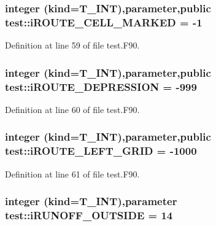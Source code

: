 \hypertarget{namespacetest_a0b4633c7ece605f3f9e541d1bb6068b1}{
\subsubsection[{iROUTE\_\-CELL\_\-MARKED}]{\setlength{\rightskip}{0pt plus 5cm}integer (kind={\bf T\_\-INT}),parameter,public {\bf test::iROUTE\_\-CELL\_\-MARKED} = -\/1}}
\label{namespacetest_a0b4633c7ece605f3f9e541d1bb6068b1}


Definition at line 59 of file test.F90.

\hypertarget{namespacetest_a238a0131e776ca1d31fb18253d86fdbe}{
\subsubsection[{iROUTE\_\-DEPRESSION}]{\setlength{\rightskip}{0pt plus 5cm}integer (kind={\bf T\_\-INT}),parameter,public {\bf test::iROUTE\_\-DEPRESSION} = -\/999}}
\label{namespacetest_a238a0131e776ca1d31fb18253d86fdbe}


Definition at line 60 of file test.F90.

\hypertarget{namespacetest_a828d11529416772ecac92d8ca31c2056}{
\subsubsection[{iROUTE\_\-LEFT\_\-GRID}]{\setlength{\rightskip}{0pt plus 5cm}integer (kind={\bf T\_\-INT}),parameter,public {\bf test::iROUTE\_\-LEFT\_\-GRID} = -\/1000}}
\label{namespacetest_a828d11529416772ecac92d8ca31c2056}


Definition at line 61 of file test.F90.

\hypertarget{namespacetest_a4e979c97a931d097b815a1e8b62663f9}{
\subsubsection[{iRUNOFF\_\-OUTSIDE}]{\setlength{\rightskip}{0pt plus 5cm}integer (kind={\bf T\_\-INT}),parameter {\bf test::iRUNOFF\_\-OUTSIDE} = 14}}
\label{namespacetest_a4e979c97a931d097b815a1e8b62663f9}


